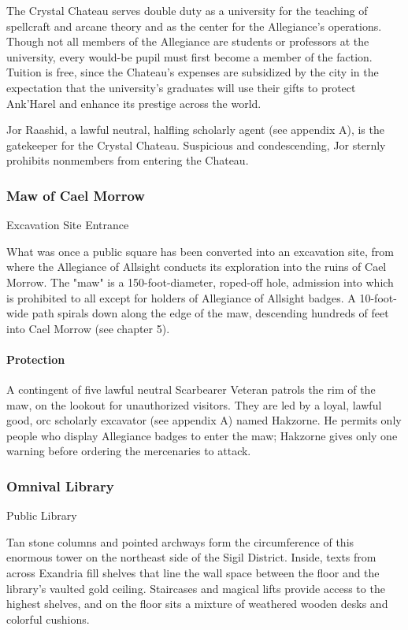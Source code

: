 \documentclass[10pt,a4paper,twoside,twocolumn,openany,nodeprecatedcode]{dndbook}
\begin{document}
The Crystal Chateau serves double duty as a university for the teaching of spellcraft and arcane theory and as the center for the Allegiance's operations. Though not all members of the Allegiance are students or professors at the university, every would-be pupil must first become a member of the faction. Tuition is free, since the Chateau's expenses are subsidized by the city in the expectation that the university's graduates will use their gifts to protect Ank'Harel and enhance its prestige across the world.

Jor Raashid, a lawful neutral, halfling scholarly agent (see appendix A), is the gatekeeper for the Crystal Chateau. Suspicious and condescending, Jor sternly prohibits nonmembers from entering the Chateau.

\subsubsection{Maw of Cael Morrow}
Excavation Site Entrance

What was once a public square has been converted into an excavation site, from where the Allegiance of Allsight conducts its exploration into the ruins of Cael Morrow. The "maw" is a 150-foot-diameter, roped-off hole, admission into which is prohibited to all except for holders of Allegiance of Allsight badges. A 10-foot-wide path spirals down along the edge of the maw, descending hundreds of feet into Cael Morrow (see chapter 5).

\paragraph{Protection}
A contingent of five lawful neutral Scarbearer Veteran patrols the rim of the maw, on the lookout for unauthorized visitors. They are led by a loyal, lawful good, orc scholarly excavator (see appendix A) named Hakzorne. He permits only people who display Allegiance badges to enter the maw; Hakzorne gives only one warning before ordering the mercenaries to attack.

\subsubsection{Omnival Library}
Public Library

Tan stone columns and pointed archways form the circumference of this enormous tower on the northeast side of the Sigil District. Inside, texts from across Exandria fill shelves that line the wall space between the floor and the library's vaulted gold ceiling. Staircases and magical lifts provide access to the highest shelves, and on the floor sits a mixture of weathered wooden desks and colorful cushions.
\end{document}
